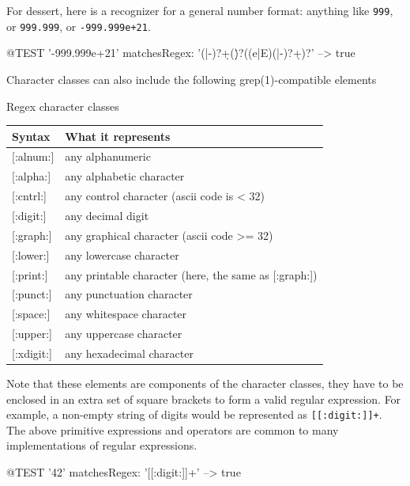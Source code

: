 \documentclass[10pt,twoside,chapterprefix=false]{scrbook}
\newcommand{\codecolor}{\color{blue!65}}
\renewcommand{\ct}{\lstinline[mathescape=false,basicstyle={\sffamily\upshape}]}
\renewcommand{\lct}[1]{{\codecolor\textsf{\textup{#1}}}}
\begin{document}
{For dessert, here is a recognizer for a general number format: anything like \ct{999}, or \ct{999.999}, or \ct{-999.999e+21}.
\begin{ToSh-code}{@TEST}
'-999.999e+21' matchesRegex: '(\+|-)?\d+(\.\d*)?((e|E)(\+|-)?\d+)?' --> true
\end{ToSh-code}

Character classes can also include the following grep(1)-compatible elements

\begin{table}[htb]
\begin{margincap}{Regex character classes}
	\centering
	\begin{tabular}{lp{8cm}}
		\toprule
		Syntax & What it represents \\
		\midrule

\lct{[:alnum:]} & any alphanumeric \\
\lct{[:alpha:]} & any alphabetic character\\
\lct{[:cntrl:]} & any control character (ascii code is \lct{< 32})\\
\lct{[:digit:]} & any decimal digit\\
\lct{[:graph:]} & any graphical character (ascii code \lct{>= 32})\\
\lct{[:lower:]} & any lowercase character\\
\lct{[:print:]} & any printable character (here, the same as \lct{[:graph:]})\\
\lct{[:punct:]} & any punctuation character\\
\lct{[:space:]} & any whitespace character\\
\lct{[:upper:]} & any uppercase character\\
\lct{[:xdigit:]} & any hexadecimal character \\

		\bottomrule
	\end{tabular}
	\label{tab:charclasses}
	\end{margincap}
\end{table}

Note that these elements are components of the character classes, \ie they have to be enclosed in an extra set of square brackets to form a valid regular expression.  For example, a non-empty string of digits would be represented as \ct{[[:digit:]]+}. The above primitive expressions and operators are common to many implementations of regular expressions.

\begin{ToSh-code}{@TEST}
'42' matchesRegex: '[[:digit:]]+' --> true
\end{ToSh-code}

}
\end{document}
